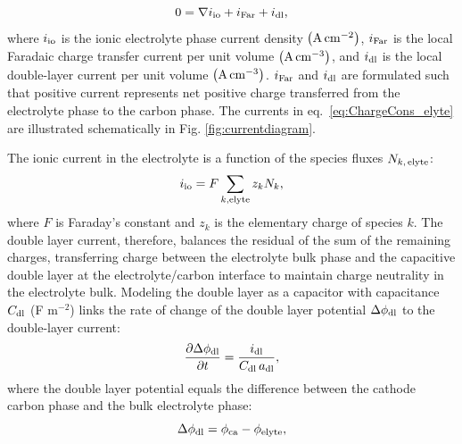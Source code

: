 \documentclass{elsarticle}
\begin{document}
 \begin{equation}\label{eq:ChargeCons_elyte}
     0 = \nabla i_{\rm io} + i_{\rm Far} + i_{\rm dl},
 \end{equation}
where $i_{\rm io}$ is the ionic electrolyte phase current density ${\rm \left(A\,cm^{-2}\right)}$, $i_{\rm Far}$ is the local Faradaic charge transfer current per unit volume ${\rm \left(A\,cm^{-3}\right)}$, and $i_{\rm dl}$ is the local double-layer current per unit volume ${\rm \left(A\,cm^{-3}\right)}$.  $i_{\rm Far}$ and $i_{\rm dl}$ are formulated such that positive current represents net positive charge transferred from the electrolyte phase to the carbon phase. The currents in eq.~\ref{eq:ChargeCons_elyte} are illustrated schematically in Fig. \ref{fig:currentdiagram}. 


The ionic current in the electrolyte is a function of the species fluxes $N_{k,\,{\rm elyte}}$:
\begin{equation}\label{eq:i_io}
    i_{\rm io} = F\sum_{k,{\rm elyte}} z_kN_{k},
\end{equation}
where $F$ is Faraday's constant and $z_k$ is the elementary charge of species $k$. The double layer current, therefore, balances the residual of the sum of the remaining charges, transferring charge between the electrolyte bulk phase and the capacitive double layer at the electrolyte/carbon interface to maintain charge neutrality in the electrolyte bulk. Modeling the double layer as a capacitor with capacitance $C_{\rm dl}$ (F m$^{-2}$) links the rate of change of the double layer potential $\Delta \phi_{\rm dl}$ to the double-layer current:
\begin{equation}\label{eq:ddPhi_dt}
    \frac{\partial \Delta \phi_{\rm dl}}{\partial t} = \frac{i_{\rm dl}}{C_{\rm dl}\,a_{\rm dl}},
\end{equation}
where the double layer potential equals the difference between the cathode carbon phase and the bulk electrolyte phase:
\begin{equation}\label{eq:dPhi_dl}
    \Delta \phi_{\rm dl} = \phi_{\rm ca} - \phi_{\rm elyte},
\end{equation}
\end{document}
